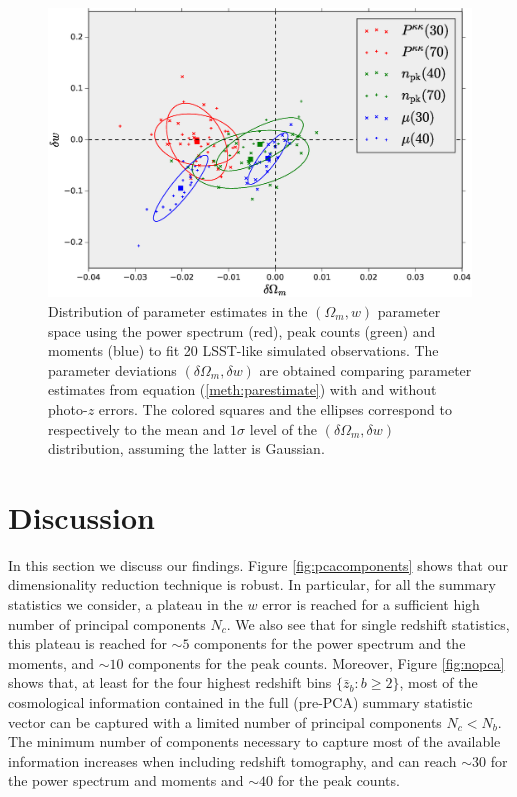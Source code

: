 \documentclass[reprint,aps,prd,superscriptaddress,showkeys,showpacs]{revtex4-1}
\begin{document}
\begin{figure}
\includegraphics[scale=0.3]{Figures/photoz_bias_Om-w.eps}
\caption{Distribution of parameter estimates in the $(\Omega_m,w)$ parameter space using the power spectrum (red), peak counts (green) and moments (blue) to fit 20 LSST-like simulated observations. The parameter deviations $(\delta\Omega_m,\delta w)$ are obtained comparing parameter estimates from equation (\ref{meth:parestimate}) with and without photo-$z$ errors. The colored squares and the ellipses correspond to respectively to the mean and $1\sigma$ level of the $(\delta\Omega_m,\delta w)$ distribution, assuming the latter is Gaussian.}
\label{fig:photozbias}
\end{figure}


\section{Discussion}
\label{sec:discussion}

In this section we discuss our findings. Figure \ref{fig:pcacomponents} shows that our dimensionality reduction technique is robust. In particular, for all the summary statistics we consider, a plateau in the $w$ error is reached for a sufficient high number of principal components $N_c$. We also see that for single redshift statistics, this plateau is reached for $\sim 5$ components for the power spectrum and the moments, and $\sim 10$ components for the peak counts. Moreover, Figure \ref{fig:nopca} shows that, at least for the four highest redshift bins $\{\bar{z}_b: b\geq 2\}$, most of the cosmological information contained in the full (pre-PCA) summary statistic vector can be captured with a limited number of principal components $N_c<N_b$. The minimum number of components necessary to capture most of the available information increases when including redshift tomography, and can reach $\sim 30$ for the power spectrum and moments and $\sim 40$ for the peak counts. 
\end{document}
